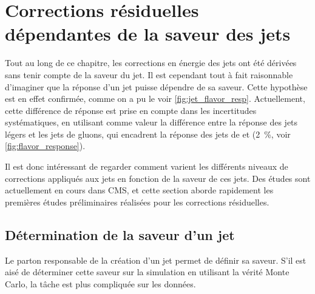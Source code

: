 \section{Corrections résiduelles dépendantes de la saveur des jets}

Tout au long de ce chapitre, les corrections en énergie des jets ont été dérivées sans tenir compte de la saveur du jet. Il est cependant tout à fait raisonnable d'imaginer que la réponse d'un jet puisse dépendre de sa saveur. Cette hypothèse est en effet confirmée, comme on a pu le voir \cref{fig:jet_flavor_resp}. Actuellement, cette différence de réponse est prise en compte dans les incertitudes systématiques, en utilisant comme valeur la différence entre la réponse des jets légers et les jets de gluons, qui encadrent la réponse des jets de \Pcharm et \Pbottom (\tilde\SI{2}{\percent}, voir \cref{fig:flavor_response}).

Il est donc intéressant de regarder comment varient les différents niveaux de corrections appliqués aux jets en fonction de la saveur de ces jets. Des études sont actuellement en cours dans CMS, et cette section aborde rapidement les premières études préliminaires réalisées pour les corrections résiduelles.

\subsection{Détermination de la saveur d'un jet}

Le parton responsable de la création d'un jet permet de définir sa saveur. S'il est aisé de déterminer cette saveur sur la simulation en utilisant la vérité Monte Carlo, la tâche est plus compliquée sur les données.

